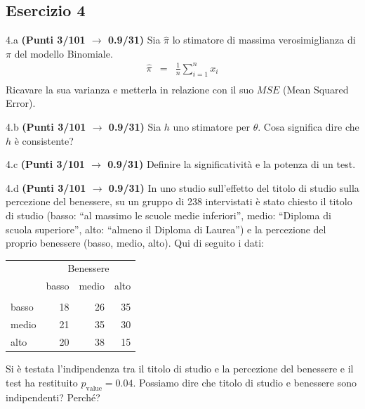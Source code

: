 \documentclass[
  11pt,
]{book}
\theoremstyle{mytheoremstyle}
\theoremstyle{mydefstyle}
\begin{document}
\subsection{Esercizio 4}\label{esercizio-4-22}

4.a \textbf{(Punti 3/101 \(\rightarrow\) 0.9/31)} Sia \(\hat \pi\) lo stimatore di massima verosimiglianza di \(\pi\) del modello Binomiale.
\begin{eqnarray*}
  \hat\pi &=&  \frac 1n\sum_{i=1}^nx_i\\
\end{eqnarray*}
Ricavare la sua varianza e metterla in relazione con il suo \(MSE\) (Mean Squared Error).

4.b \textbf{(Punti 3/101 \(\rightarrow\) 0.9/31)} Sia \(h\) uno stimatore per \(\theta\). Cosa significa dire che \(h\) è consistente?

4.c \textbf{(Punti 3/101 \(\rightarrow\) 0.9/31)} Definire la significatività e la potenza di un test.

4.d \textbf{(Punti 3/101 \(\rightarrow\) 0.9/31)} In uno studio sull'effetto del titolo di studio sulla percezione del benessere, su un gruppo di 238 intervistati è stato chiesto il titolo di studio (basso: ``al massimo le scuole medie inferiori'', medio: ``Diploma di scuola superiore'', alto: ``almeno il Diploma di Laurea'') e la percezione del proprio benessere (basso, medio, alto). Qui di seguito i dati:

\begin{table}[H]
\centering\centering
\begin{tabular}{lrrr}
\toprule
\multicolumn{1}{c}{ } & \multicolumn{3}{c}{Benessere} \\
\cmidrule(l{3pt}r{3pt}){2-4}
  & basso & medio & alto\\
\midrule
\addlinespace[0.3em]
\multicolumn{4}{l}{\textbf{Titolo di studio}}\\
\hspace{1em}basso & 18 & 26 & 35\\
\hspace{1em}medio & 21 & 35 & 30\\
\hspace{1em}alto & 20 & 38 & 15\\
\bottomrule
\end{tabular}
\end{table}

Si è testata l'indipendenza tra il titolo di studio e la percezione del benessere e il test ha restituito \(p_\text{value}=0.04\). Possiamo dire che titolo di studio e benessere sono indipendenti? Perché?
\end{document}
